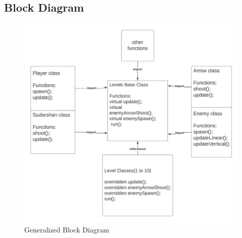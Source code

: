 \newpage
\subsection{Block Diagram}

\vspace{2cm}
\begin{figure}[h]
	
	\centering
	\includegraphics[width = \textwidth]{sec/pdf/blockDiagram}
	\caption{Generalized Block Diagram}
\end{figure}

\newpage
